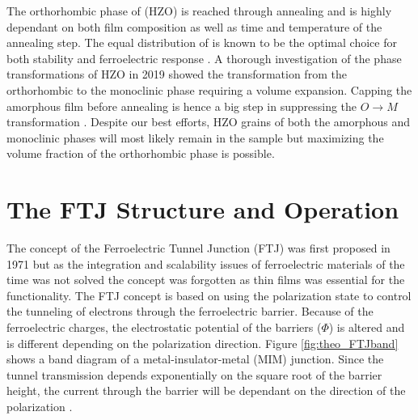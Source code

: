 \documentclass[11pt,twoside]{eitExjobb}
\begin{document}
The orthorhombic phase of  (HZO) is reached through annealing and is
highly dependant on both film composition as well as time and temperature of the
annealing step. The equal distribution of  is known to
be the optimal choice for both stability and ferroelectric response
\cite{muller2012ferroelectricity}. A thorough investigation of the phase
transformations of HZO in 2019 showed the transformation from the orthorhombic
to the monoclinic phase requiring a volume expansion. Capping the amorphous
film before annealing is hence a big step in suppressing the $O \rightarrow M$
transformation \cite{migita2019phase}. Despite our best efforts, HZO grains of
both the amorphous and monoclinic phases will most likely remain in the sample
but maximizing the volume fraction of the orthorhombic phase is possible.

\section{The FTJ Structure and Operation}


The concept of the Ferroelectric Tunnel Junction (FTJ) was first proposed in 1971
but as the integration and scalability issues of ferroelectric materials of the
time was not solved the concept was forgotten as thin films was essential for
the functionality. The FTJ concept is based on using the polarization state to
control the tunneling of electrons through the ferroelectric barrier. Because
of the ferroelectric charges, the electrostatic potential of the barriers
($\Phi$) is altered and is different depending on the polarization direction.
Figure \ref{fig:theo_FTJband} shows a band diagram of a metal-insulator-metal
(MIM) junction. Since the tunnel transmission depends exponentially on the
square root of the barrier height, the current through the barrier will be
dependant on the direction of the polarization \cite{garcia2014ferroelectric}. 
\end{document}
